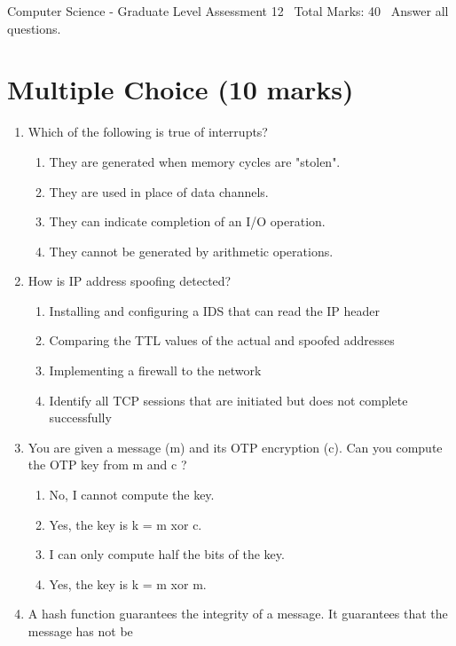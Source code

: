 \documentclass[12pt]{article}
\begin{document}
\begin{center}
Computer Science - Graduate Level Assessment 12 \
Total Marks: 40 \
Answer all questions.
\end{center}

\section*{Multiple Choice (10 marks)}
\begin{enumerate}[label=\arabic*.]
\item Which of the following is true of interrupts?
\begin{enumerate}[label=(\alph*)]
    \item They are generated when memory cycles are "stolen".
    \item They are used in place of data channels.
    \item They can indicate completion of an I/O operation.
    \item They cannot be generated by arithmetic operations.
\end{enumerate}
\item How is IP address spoofing detected?
\begin{enumerate}[label=(\alph*)]
    \item Installing and configuring a IDS that can read the IP header
    \item Comparing the TTL values of the actual and spoofed addresses
    \item Implementing a firewall to the network
    \item Identify all TCP sessions that are initiated but does not complete successfully
\end{enumerate}
\item You are given a message (m) and its OTP encryption (c). Can you compute the OTP key from m and c ?
\begin{enumerate}[label=(\alph*)]
    \item No, I cannot compute the key.
    \item Yes, the key is k = m xor c.
    \item I can only compute half the bits of the key.
    \item Yes, the key is k = m xor m.
\end{enumerate}
\item A hash function guarantees the integrity of a message. It guarantees that the message has not be
\begin{enumerate}[label=(\alph*)]

\end{enumerate}
\end{enumerate}
\end{document}

